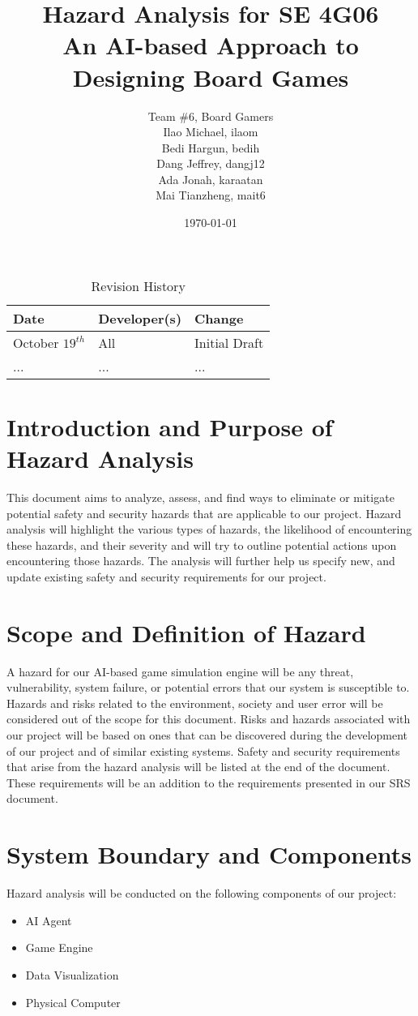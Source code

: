 \documentclass{article}
\title{Hazard Analysis for SE 4G06 \\ An AI-based Approach to Designing Board Games}
\author{Team \#6, Board Gamers
\\ Ilao Michael, ilaom
\\ Bedi Hargun, bedih
\\ Dang Jeffrey, dangj12
\\ Ada Jonah, karaatan
\\ Mai Tianzheng, mait6}
\date{\today}
\begin{document}
\begin{table}[hp]
\caption{Revision History} \label{TblRevisionHistory}
\begin{tabularx}{\textwidth}{llX}
\toprule
\textbf{Date} & \textbf{Developer(s)} & \textbf{Change}\\
\midrule
October $19^{th}$ & All & Initial Draft\\
... & ... & ...\\
\bottomrule
\end{tabularx}
\end{table}

\newpage

\maketitle
\newpage
\tableofcontents


\newpage
\section{Introduction and Purpose of Hazard Analysis}
This document aims to analyze, assess, and find ways to eliminate or mitigate potential safety and security hazards that are applicable to our project. Hazard analysis will highlight the various types of hazards, the likelihood of encountering these hazards, and their severity and will try to outline potential actions upon encountering those hazards. The analysis will further help us specify new, and update existing safety and security requirements for our project. 

\section{Scope and Definition of Hazard}
A hazard for our AI-based game simulation engine will be any threat, vulnerability, system failure, or potential errors that our system is susceptible to. Hazards and risks related to the environment, society and user error will be considered out of the scope for this document. Risks and hazards associated with our project will be based on ones that can be discovered during the development of our project and of similar existing systems. Safety and security requirements that arise from the hazard analysis will be listed at the end of the document. These requirements will be an addition to the requirements presented in our SRS document. 

\section{System Boundary and Components}
Hazard analysis will be conducted on the following components of our project:
\begin{itemize}
    \item AI Agent
    \item Game Engine
    \item Data Visualization
    \item Physical Computer
\end{itemize}
\end{document}
